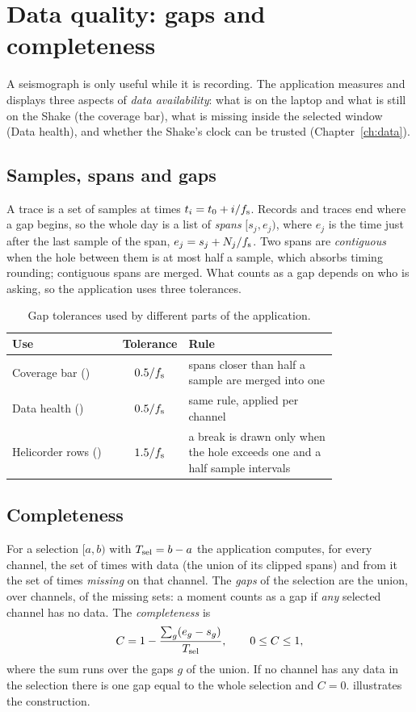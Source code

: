 \chapter{Data quality: gaps and completeness}\label{ch:quality}

A seismograph is only useful while it is recording. The application measures and displays three aspects of
\emph{data availability}: what is on the laptop and what is still on the Shake (the coverage bar), what is missing
inside the selected window (Data health), and whether the Shake's clock can be trusted (Chapter~\ref{ch:data}).

\section{Samples, spans and gaps}
A trace is a set of samples at times $t_i=t_0+i/f_{\mathrm{s}}$. Records and traces end where a gap begins, so the whole day is a
list of \emph{spans} $[s_j,e_j)$, where $e_j$ is the time just after the last sample of the span, $e_j=s_j+N_j/f_{\mathrm{s}}$. Two
spans are \emph{contiguous} when the hole between them is at most half a sample, which absorbs timing rounding;
contiguous spans are merged. What counts as a gap depends on who is asking, so the application uses three tolerances.

\begin{table}[tbp]
\centering\small
\caption{Gap tolerances used by different parts of the application.}\label{tab:tol}
\begin{tabular}{@{}L{0.34\linewidth}cL{0.46\linewidth}@{}}
\toprule
Use & Tolerance & Rule\\ \midrule
Coverage bar () & $0.5/f_{\mathrm{s}}$ & spans closer than half a sample are merged into one\\
Data health () & $0.5/f_{\mathrm{s}}$ & same rule, applied per channel\\
Helicorder rows () & $1.5/f_{\mathrm{s}}$ & a break is drawn only when the hole exceeds one and a
  half sample intervals\\
\bottomrule
\end{tabular}
\end{table}

\section{Completeness}
For a selection $[a,b)$ with $T_{\mathrm{sel}}=b-a$ the application computes, for every channel, the set of times with data (the union
of its clipped spans) and from it the set of times \emph{missing} on that channel. The \emph{gaps} of the selection are the
union, over channels, of the missing sets: a moment counts as a gap if \emph{any} selected channel has no data. The
\emph{completeness} is
\begin{equation}\label{eq:complete}
  C = 1-\frac{\sum_g (e_g - s_g)}{T_{\mathrm{sel}}}, \qquad 0\le C\le1,
\end{equation}
where the sum runs over the gaps $g$ of the union. If no channel has any data in the selection there is one gap equal to
the whole selection and $C=0$.  illustrates the construction.

